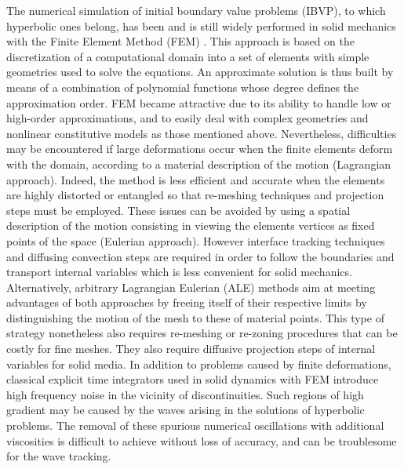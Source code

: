 The numerical simulation of initial boundary value problems (IBVP), to which hyperbolic ones belong, has been and is still widely performed in solid mechanics with the Finite Element Method (FEM) \cite{Belytschko}.
This approach is based on the discretization of a computational domain into a set of elements with simple geometries used to solve the equations.
An approximate solution is thus built by means of a combination of polynomial functions whose degree defines the approximation order.
FEM became attractive due to its ability to handle low or high-order approximations, and to easily deal with complex geometries and nonlinear constitutive models as those mentioned above.  %
Nevertheless, difficulties may be encountered if large deformations occur when the finite elements deform with the domain, according to a material description of the motion (Lagrangian approach).
Indeed, the method is less efficient and accurate when the elements are highly distorted or entangled so that re-meshing techniques and projection steps must be employed.
These issues can be avoided by using a spatial description of the motion consisting in viewing the elements vertices as fixed points of the space (Eulerian approach).
However interface tracking techniques and diffusing convection steps are required in order to follow the boundaries and transport internal variables which is less convenient for solid mechanics.
Alternatively, arbitrary Lagrangian Eulerian (ALE) methods aim at meeting advantages of both approaches by freeing itself of their respective limits by distinguishing the motion of the mesh to these of material points.
This type of strategy nonetheless also requires re-meshing or re-zoning procedures that can be costly for fine meshes. %
They also require diffusive projection steps of internal variables for solid media.
In addition to problems caused by finite deformations, classical explicit time integrators used in solid dynamics with FEM introduce high frequency noise in the vicinity of discontinuities.
Such regions of high gradient may be caused by the waves arising in the solutions of hyperbolic problems.
The removal of these spurious numerical oscillations with additional viscosities is difficult to achieve without loss of accuracy, and can be troublesome for the wave tracking.

